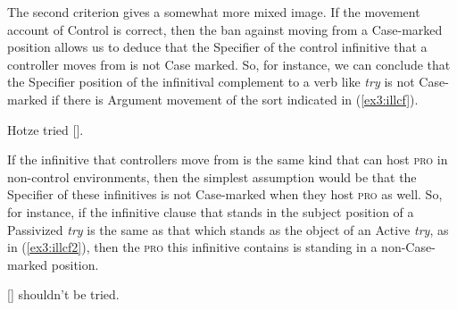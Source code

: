 The second criterion gives a somewhat more mixed image. If the movement account of Control is correct, then the ban against moving from a Case-marked position allows us to deduce that the Specifier of the control infinitive that a controller moves from is not Case marked. So, for instance, we can conclude that the Specifier position of the infinitival complement to a verb like \emph{try} is not Case-marked if there is Argument movement of the sort indicated in (\ref{ex3:illcf}).
\begin{exe}
\ex \label{ex3:illcf} \linkto Hotze \under tried [].
\end{exe}
If the infinitive that controllers move from is the same kind that can host \textsc{pro} in non-control environments, then the simplest assumption would be that the Specifier of these infinitives is not Case-marked when they host \textsc{pro} as well. So, for instance, if the infinitive clause that stands in the subject position of a Passivized \emph{try} is the same as that which stands as the object of an Active \emph{try}, as in (\ref{ex3:illcf2}), then the \textsc{pro} this infinitive contains is standing in a non-Case-marked position.
\begin{exe}
\ex \label{ex3:illcf2} [] shouldn't be tried.
\end{exe}

